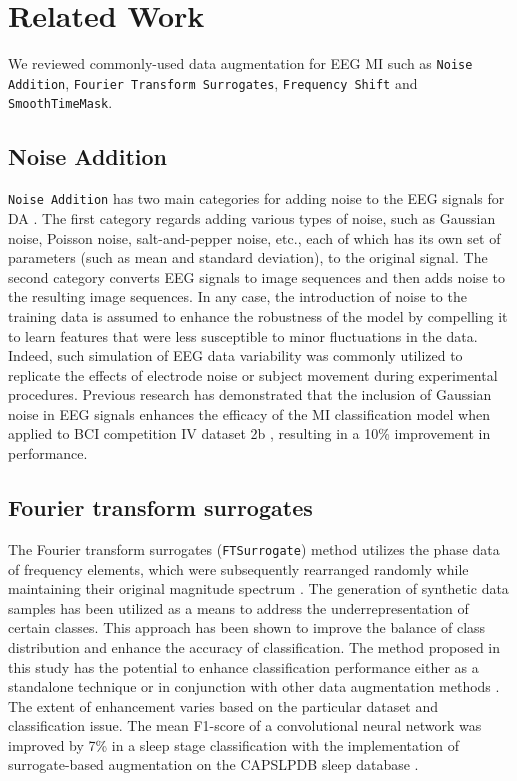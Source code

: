 \section{Related Work}

We reviewed commonly-used data augmentation for EEG MI such as \texttt{Noise Addition}, \texttt{Fourier Transform Surrogates}, \texttt{Frequency Shift} and \texttt{SmoothTimeMask}.

\subsection{Noise Addition}
\texttt{Noise Addition} has two main categories for adding noise to the EEG signals for DA \cite{lashgari2020data}.
The first category regards adding various types of noise, such as Gaussian noise, Poisson noise, salt-and-pepper noise, etc., each of which has its own set of parameters (such as mean and standard deviation), to the original signal.
The second category converts EEG signals to image sequences and then adds noise to the resulting image sequences. 
In any case, the introduction of noise to the training data is assumed to enhance the robustness of the model by compelling it to learn features that were less susceptible to minor fluctuations in the data.
Indeed, such simulation of EEG data variability was commonly utilized to replicate the effects of electrode noise or subject movement during experimental procedures.
Previous research has demonstrated that the inclusion of Gaussian noise in EEG signals enhances the efficacy of the MI classification model when applied to BCI competition IV dataset 2b \cite{brunner2008bci}, resulting in a 10\% improvement in performance.

\subsection{Fourier transform surrogates}
The Fourier transform surrogates (\texttt{FTSurrogate}) method utilizes the phase data of frequency elements, which were subsequently rearranged randomly while maintaining their original magnitude spectrum \cite{schwabedal2018addressing}.
The generation of synthetic data samples has been utilized as a means to address the underrepresentation of certain classes.
This approach has been shown to improve the balance of class distribution and enhance the accuracy of classification.
The method proposed in this study has the potential to enhance classification performance either as a standalone technique or in conjunction with other data augmentation methods \cite{schwabedal2018addressing}.
The extent of enhancement varies based on the particular dataset and classification issue.
The mean F1-score of a convolutional neural network was improved by 7\% in a sleep stage classification with the implementation of surrogate-based augmentation on the CAPSLPDB sleep database \cite{terzano2001atlas}.

